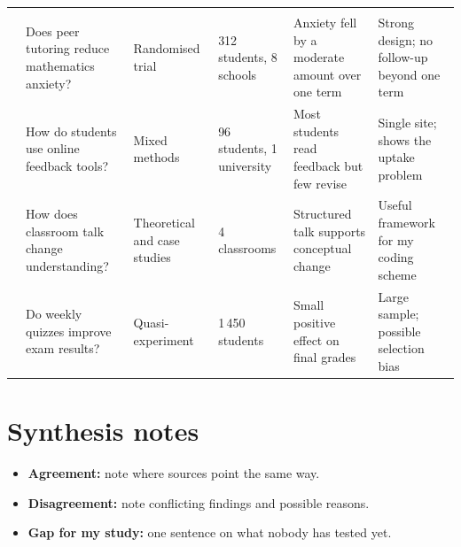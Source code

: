 \medskip
\renewcommand{\arraystretch}{1.35}
\small
\begin{longtable}{@{}P{3.2cm}P{3.4cm}P{2.6cm}P{2.4cm}P{4.6cm}P{4.4cm}@{}}
 &  &  &  &  &  \\
\endfirsthead
{}
 &  &  &  &  &  \\
\endhead
\bottomrule
\endlastfoot
\citet{garcia2020} & Does peer tutoring reduce mathematics anxiety? & Randomised trial & 312 students, 8 schools & Anxiety fell by a moderate amount over one term & Strong design; no follow-up beyond one term \\
\citet{kim2021} & How do students use online feedback tools? & Mixed methods & 96 students, 1 university & Most students read feedback but few revise & Single site; shows the uptake problem \\
\citet{osei2019} & How does classroom talk change understanding? & Theoretical and case studies & 4 classrooms & Structured talk supports conceptual change & Useful framework for my coding scheme \\
\citet{novak2022} & Do weekly quizzes improve exam results? & Quasi-experiment & 1\,450 students & Small positive effect on final grades & Large sample; possible selection bias \\
\end{longtable}

\normalsize
\section*{Synthesis notes}
\begin{itemize}
  \item \textbf{Agreement:} note where sources point the same way.
  \item \textbf{Disagreement:} note conflicting findings and possible reasons.
  \item \textbf{Gap for my study:} one sentence on what nobody has tested yet.
\end{itemize}





